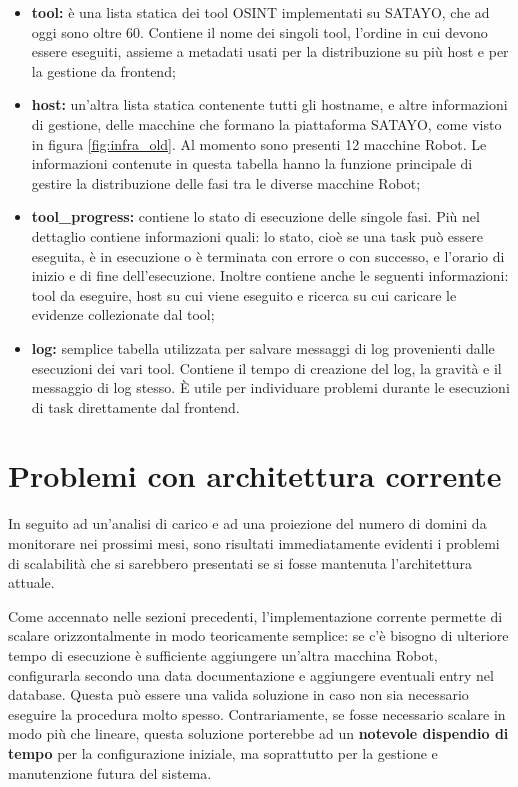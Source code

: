 \begin{itemize}
  \item \textbf{tool:} è una lista statica dei tool OSINT implementati su SATAYO,
    che ad oggi sono oltre 60. Contiene il nome dei singoli tool, l'ordine in
    cui devono essere eseguiti, assieme a metadati usati per la distribuzione su
    più host e per la gestione da frontend;

  \item \textbf{host:} un'altra lista statica contenente tutti gli hostname, e altre
    informazioni di gestione, delle macchine che formano la piattaforma SATAYO, come
    visto in figura \ref{fig:infra_old}. Al momento sono presenti 12 macchine
    Robot. Le informazioni contenute in questa tabella hanno la funzione principale
    di gestire la distribuzione delle fasi tra le diverse macchine Robot;

  \item \textbf{tool\_progress:} contiene lo stato di esecuzione delle singole
    fasi. Più nel dettaglio contiene informazioni quali: lo stato, cioè se una task
    può essere eseguita, è in esecuzione o è terminata con errore o con successo,
    e l'orario di inizio e di fine dell'esecuzione. Inoltre contiene anche le
    seguenti informazioni: tool da eseguire, host su cui viene eseguito e
    ricerca su cui caricare le evidenze collezionate dal tool;

  \item \textbf{log:} semplice tabella utilizzata per salvare messaggi di log
    provenienti dalle esecuzioni dei vari tool. Contiene il tempo di creazione del
    log, la gravità e il messaggio di log stesso. È utile per individuare problemi
    durante le esecuzioni di task direttamente dal frontend.
\end{itemize}

\pagebreak
\section{Problemi con architettura corrente}
\label{sec:problemi}

In seguito ad un'analisi di carico e ad una proiezione del numero di domini da
monitorare nei prossimi mesi, sono risultati immediatamente evidenti i problemi di
scalabilità che si sarebbero presentati se si fosse mantenuta l'architettura attuale.

Come accennato nelle sezioni precedenti, l'implementazione corrente permette di
scalare orizzontalmente in modo teoricamente semplice: se c'è bisogno di ulteriore
tempo di esecuzione è sufficiente aggiungere un'altra macchina Robot,
configurarla secondo una data documentazione e aggiungere eventuali entry nel
database. Questa può essere una valida soluzione in caso non sia necessario eseguire
la procedura molto spesso. Contrariamente, se fosse necessario scalare in modo più
che lineare, questa soluzione porterebbe ad un \textbf{notevole dispendio di
tempo} per la configurazione iniziale, ma soprattutto per la gestione e
manutenzione futura del sistema.

